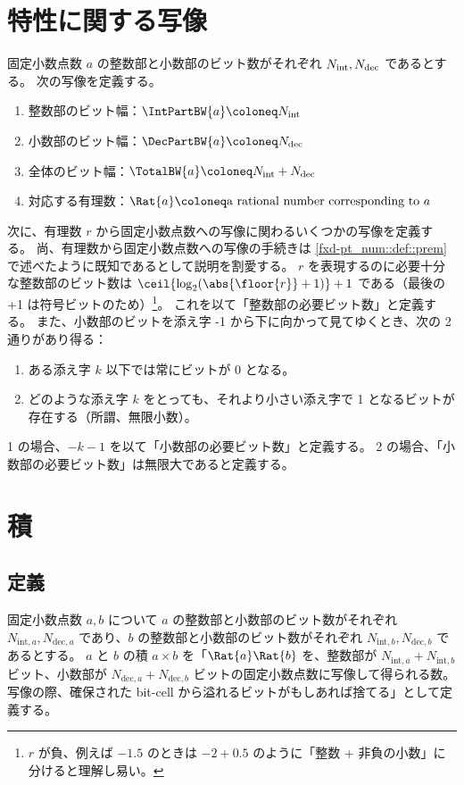    \section{特性に関する写像}
        固定小数点数 $a$ の整数部と小数部のビット数がそれぞれ ${N_\text{int}}, {N_\text{dec}}$ であるとする。
        次の写像を定義する。
        \begin{enumerate}
            \item 整数部のビット幅：$\IntPartBW{a} \coloneq \Ni$
            \item 小数部のビット幅：$\DecPartBW{a} \coloneq \Nd$
            \item 全体のビット幅：$\TotalBW{a} \coloneq \Ni + \Nd$
            \item 対応する有理数：$\Rat{a} \coloneq \text{a rational number corresponding to }a$
        \end{enumerate}
        次に、有理数 $r$ から固定小数点数への写像に関わるいくつかの写像を定義する。
        尚、有理数から固定小数点数への写像の手続きは \ref{fxd-pt_num::def::prem} で述べたように既知であるとして説明を割愛する。
        $r$ を表現するのに必要十分な整数部のビット数は $\ceil{\log_2(\abs{\floor{r}}+1)}+1$ である（最後の +1 は符号ビットのため）\footnote{$r$ が負、例えば $-1.5$ のときは $-2+0.5$ のように「整数 + 非負の小数」に分けると理解し易い。}。
        これを以て「整数部の必要ビット数」と定義する。
        また、小数部のビットを添え字 -1 から下に向かって見てゆくとき、次の 2 通りがあり得る：
        \begin{enumerate}
            \item ある添え字 $k$ 以下では常にビットが 0 となる。
            \item どのような添え字 $k$ をとっても、それより小さい添え字で 1 となるビットが存在する（所謂、無限小数）。
        \end{enumerate}
        1 の場合、$-k-1$ を以て「小数部の必要ビット数」と定義する。
        2 の場合、「小数部の必要ビット数」は無限大であると定義する。
    \section{積}
        \newcommand{\Nia}{{N_{\text{int},a}}}
        \newcommand{\Nda}{{N_{\text{dec},a}}}
        \newcommand{\Nib}{{N_{\text{int},b}}}
        \newcommand{\Ndb}{{N_{\text{dec},b}}}
        \subsection{定義}
            固定小数点数 $a, b$ について $a$ の整数部と小数部のビット数がそれぞれ $\Nia, \Nda$ であり、$b$ の整数部と小数部のビット数がそれぞれ $\Nib, \Ndb$ であるとする。
            $a$ と $b$ の積 $a\times b$ を「$\Rat{a}\Rat{b}$ を、整数部が $\Nia+\Nib$ ビット、小数部が $\Nda+\Ndb$ ビットの固定小数点数に写像して得られる数。写像の際、確保された bit-cell から溢れるビットがもしあれば捨てる」として定義する。
            \par
